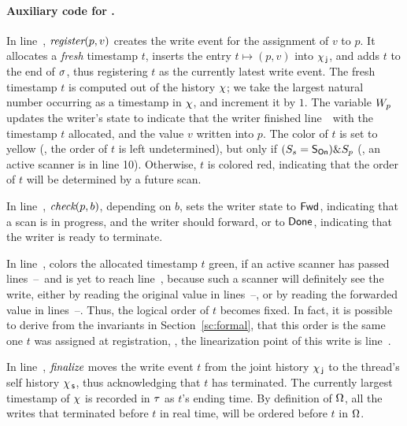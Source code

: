 

\paragraph{Auxiliary code for \jywrite.} In line~\lineWrtWrt, $\textit{register}(p, v)$ creates the write event
for the assignment of $v$ to $p$. It allocates a \emph{fresh}
timestamp $t$, inserts the entry $t \mapsto (p, v)$ into $\chi_{\, \mathsf{j}}$, and
adds $t$ to the end of $\sigma$, thus registering $t$ as the
currently latest write event. The fresh timestamp $t$ is computed out
of the history $\chi$; we take the largest natural number occurring
as a timestamp in $\chi$, and increment it by $1$.  The variable
$W_p$ updates the writer's state to indicate that the writer finished
line~\lineWrtWrt\ with the timestamp $t$ allocated, and the value $v$
written into $p$. The color of $t$ is set to yellow (\ie, the order
of $t$ is left undetermined), but only if $(S_s= \mathsf{S_{On}}) \& S_p$
(\ie, an active scanner is in line 10). Otherwise, $t$ is colored
red, indicating that the order of $t$ will be determined by a future
scan.

In line~\lineWrtChk, $\textit{check}(p,b)$, depending on $b$, sets the
writer state to $\mathsf{Fwd}$, indicating that a scan is in progress, and
the writer should forward, or to $\mathsf{Done}$, indicating that the writer
is ready to terminate.

In line~\lineWrtFwd,  colors the allocated timestamp $t$
green, if an active scanner has passed
lines~\lineScanClearsX--\lineScanClearsY~and is yet to reach
line~\lineScanUnsetsS, because such a scanner will definitely see the
write, either by reading the original value in
lines~\lineScanReadsX--\lineScanReadsY, or by reading the forwarded
value in lines~\lineScanReadsFX--\lineScanReadsFY. Thus, the logical
order of $t$ becomes fixed. In fact, it is possible to derive from the
invariants in Section~\ref{sc:formal}, that this order is the same one
$t$ was assigned at registration, \ie, the linearization point of
this write is line~\lineWrtWrt.

In line~\lineWrtFnz, $\textit{finalize}$ moves the write event $t$ from
the joint history $\chi_{\, \mathsf{j}}$ to the thread's self history $\chi_{\, \mathsf{s}}$, thus
acknowledging that $t$ has terminated. The currently largest timestamp
of $\chi$ is recorded in $\tau$ as $t$'s ending time. By definition of
$\Omega$, all the writes that terminated before $t$ in real
time, will be ordered before $t$ in $\Omega$.

